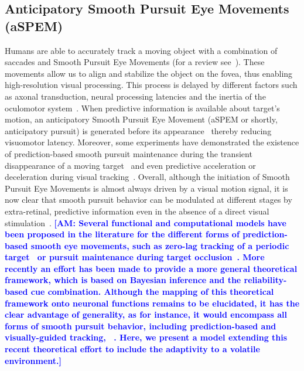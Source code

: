 \documentclass[10pt,letterpaper]{article}
\newcommand{\citep}[1]{\cite{#1}}
\newcommand{\citet}[1]{\cite{#1}}
\newcommand{\AM}[1]{\textbf{\textcolor{blue}{[AM: #1]}}}
\begin{document}
\subsection{Anticipatory Smooth Pursuit Eye Movements (aSPEM)}
Humans are able to accurately track a moving object
with a combination of saccades and
Smooth Pursuit Eye Movements (for a review see~\citet{Krauzlis2008}).
These movements allow us to align and
stabilize the object on the fovea,
thus enabling high-resolution visual processing.
This process is delayed by different factors such as axonal transduction,
neural processing latencies and the inertia of the oculomotor system~\citep{Krauzlis89}.
When predictive information is available about target's motion,
an anticipatory Smooth Pursuit Eye Movement (aSPEM or shortly, anticipatory pursuit)
is generated before its appearance~\citep{Westheimer1954, Kowler1979a, Kowler1979b}
thereby reducing visuomotor latency.
Moreover, some experiments have demonstrated the existence
of prediction-based smooth pursuit maintenance during
the transient disappearance of a moving target~\citep{Badler2006,BeckerFuchs1985,OrbandeXivryMissalLefevre_JOV2012}
and even predictive acceleration or deceleration during visual tracking~\citep{BeckerFuchs1985,CollinsBarnes2009}.
Overall, although the initiation of Smooth Pursuit Eye Movements
is almost always driven by a visual motion signal,
it is now clear that smooth pursuit behavior
can be modulated at different stages by extra-retinal, predictive information even in the absence of a direct visual stimulation~\citep{Barnes2008}.
\AM{Several functional and computational models have been proposed in the literature for the different forms of prediction-based smooth eye movements, such as zero-lag tracking of a periodic target~\citep{DallosJones1963} or pursuit maintenance during target occlusion~\citep{CollinsBarnes2009}. More recently an effort has been made to provide a more general theoretical framework, which is based on Bayesian inference and the reliability-based cue combination. Although the mapping of this theoretical framework onto neuronal functions remains to be elucidated, it has the clear advantage of generality, as for instance, it would encompass all forms of smooth pursuit behavior, including prediction-based and visually-guided tracking,  ~\citep{Bogadhi2013,Orban2013,Deravet_JOV2018,Darlington_NatNeu2018}. Here, we present a model extending this recent theoretical effort to include the adaptivity to a volatile environment.}
\end{document}
